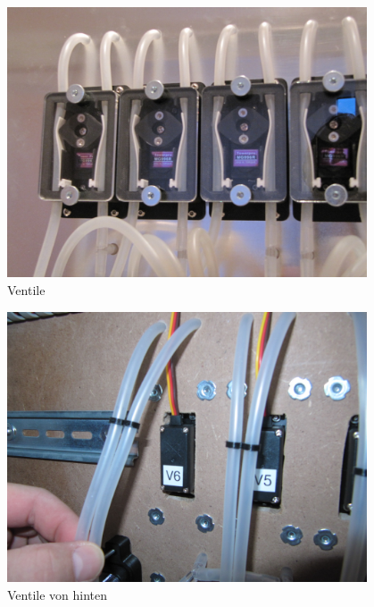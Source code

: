 \documentclass[a4paper]{scrartcl}
\begin{document}
\begin{figure}
  \centering
  \includegraphics[height=8cm]{pics/valve_front}
  \caption{Ventile} \label{valve_front}
\end{figure}

\begin{figure}
  \centering
  \includegraphics[height=8cm]{pics/valve_rear}
  \caption{Ventile von hinten} \label{valve_rear}
\end{figure}
\end{document}
